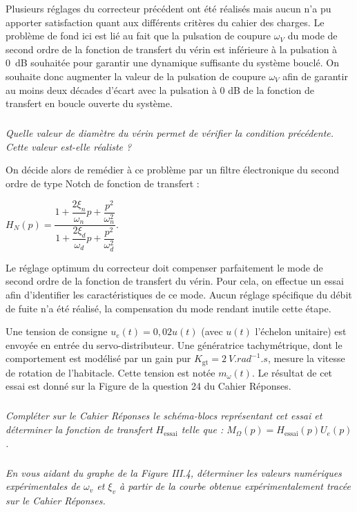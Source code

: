 \documentclass[10pt,fleqn]{article} %
\begin{document}
\begin{multicols}{2}
Plusieurs réglages du correcteur précédent ont été réalisés mais aucun n'a pu apporter satisfaction quant aux différents critères du cahier des charges. Le problème de fond ici est lié au fait que la pulsation de coupure $\omega_V$ du mode de second ordre de la fonction de transfert du vérin est inférieure à la pulsation à \SI{0}{dB} souhaitée pour garantir une dynamique suffisante du système bouclé. On souhaite donc augmenter la valeur de la pulsation de coupure $\omega_V$ afin de garantir au moins deux décades d'écart avec la pulsation à 0 dB de la fonction de transfert en boucle ouverte du système.

\subparagraph{}
\textit{Quelle valeur de diamètre du vérin permet de vérifier la condition précédente. Cette valeur est-elle réaliste ?}
\ifprof
\begin{corrige}
\end{corrige}
\else
\fi


On décide alors de remédier à ce problème par un filtre électronique du second ordre de type Notch de fonction de transfert :

$H_{N}(p)=\dfrac{1+ \dfrac{2\xi_n}{\omega_n}p + \dfrac{p^2}{\omega_n^2} }{1+ \dfrac{2\xi_d}{\omega_d}p + \dfrac{p^2}{\omega_d^2} }$.

Le réglage optimum du correcteur doit compenser parfaitement le mode de second ordre de la fonction de transfert du vérin. Pour cela, on effectue un essai afin d'identifier les caractéristiques de ce mode. Aucun réglage spécifique du débit de fuite n'a été réalisé, la compensation du mode rendant inutile cette étape.

Une tension de consigne $u_e(t) = 0,02u(t)$ (avec $u(t)$ l'échelon unitaire) est envoyée en entrée du servo-distributeur. Une génératrice tachymétrique, dont le comportement est modélisé par un gain pur $K_{\text{gt}} = \SI{2}{V.rad^{-1}.s}$, mesure la vitesse de rotation de l'habitacle. Cette tension est notée $m_{\omega}(t)$. Le résultat de cet essai est donné sur la Figure de la question 24 du Cahier Réponses.


\subparagraph{}
\textit{Compléter sur le Cahier Réponses le schéma-blocs représentant cet essai et déterminer la fonction de transfert $H_{\text{essai}}$ telle que : $M_{\Omega}(p) = H_{\text{essai}}(p)U_e(p)$.}
\ifprof
\begin{corrige}
\end{corrige}
\else
\fi


 
\subparagraph{}
\textit{En vous aidant du graphe de la Figure III.4, déterminer les valeurs numériques expérimentales de $\omega_v$ et 
$\xi_v$ à partir de la courbe obtenue expérimentalement tracée sur le Cahier Réponses.}
\ifprof
\begin{corrige}
\end{corrige}
\else
\fi


\end{multicols}
\end{document}
